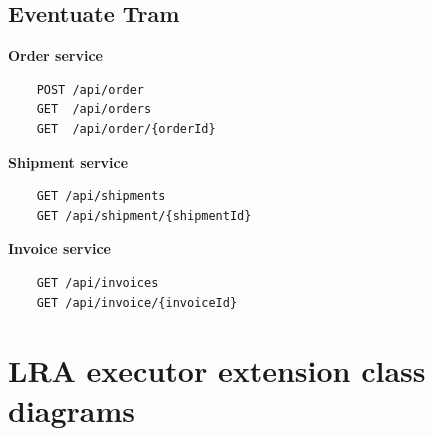 \documentclass[oneside,
  digital, %
  table,   %
  nolof,     %
  nolot,     %
]{fithesis3}
\begin{document}
\section{Eventuate Tram}

\textbf{Order service}

\begin{verbatim}
    POST /api/order
    GET  /api/orders
    GET  /api/order/{orderId}
\end{verbatim}

\noindent
\textbf{Shipment service}

\begin{verbatim}
    GET /api/shipments
    GET /api/shipment/{shipmentId}
\end{verbatim}

\noindent
\textbf{Invoice service}

\begin{verbatim}
    GET /api/invoices
    GET /api/invoice/{invoiceId}
\end{verbatim}


\chapter{LRA executor extension class diagrams}
\label{sec:appendix-class-diagrams}
\end{document}
